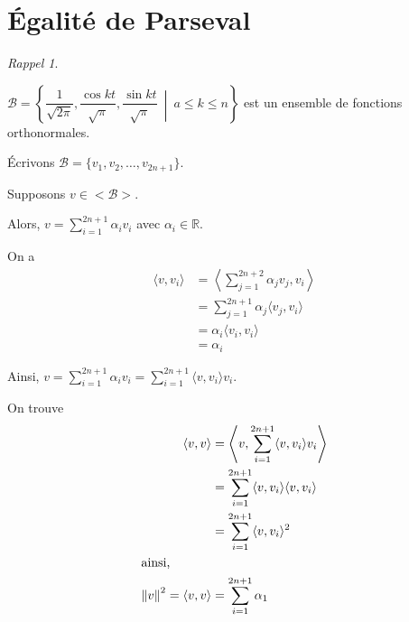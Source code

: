 \documentclass{report}
\newcommand*{\dsum}[4]{\displaystyle\sum_{#1=#2}^{#3}#4}
\newcommand*{\norme}[1]{\left\| #1 \right\|}
\newcommand*{\lte}{\leqslant}
\newcommand*{\reels}{\mathbb{R}}
\theoremstyle{definition}
\theoremstyle{remark}
\newtheorem*{rapp}{Rappel}
\begin{document}
	\section{\'Egalit\'e de Parseval}
	\begin{rapp}~

		$\mathcal{B} = \left\{ \dfrac{1}{\sqrt{2\pi}}, \dfrac{\cos kt}{\sqrt{\pi}}, \dfrac{\sin kt}{\sqrt{\pi}} ~\middle|~ a \lte k \lte n \right\}$ est un ensemble de fonctions orthonormales.

		\'Ecrivons $\mathcal{B} = \{v_1,v_2,\dots,v_{2n+1}\}$.

		Supposons $v \in <\mathcal{B}>$.

		Alors, $v = \dsum{i}{1}{2n+1}{\alpha_iv_i}$ avec $\alpha_i \in \reels$.

		On a
		\begin{align*}
			\langle v, v_i \rangle&= \left\langle \dsum{j}{1}{2n+2}{\alpha_jv_j}, v_i \right\rangle\\
			&= \dsum{j}{1}{2n+1}{\alpha_j \langle v_j, v_i \rangle}\\
			&= \alpha_i \langle v_i, v_i \rangle\\
			&= \alpha_i
		\end{align*}

		Ainsi, $v = \dsum{i}{1}{2n+1}{\alpha_i v_i} = \dsum{i}{1}{2n+1}{\langle v,v_i \rangle v_i}$.

		On trouve
		\begin{align*}
			\langle v,v \rangle&= \left\langle v, \dsum{i}{1}{2n+1}{\langle v,v_i \rangle v_i} \right\rangle\\
			&= \dsum{i}{1}{2n+1}{\langle v,v_i \rangle \langle v,v_i \rangle}\\
			&= \dsum{i}{1}{2n+1}{\langle v,v_i \rangle^2}\\
			\intertext{ainsi,}
			\norme{v}^2 = \langle v,v \rangle&= \dsum{i}{1}{2n+1}{\alpha_1}
		\end{align*}
	\end{rapp}
\end{document}
